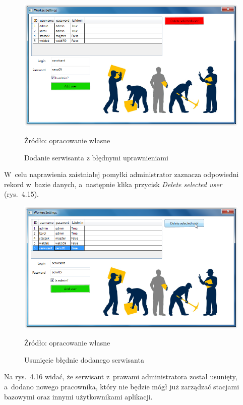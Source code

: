 \documentclass[12pt,a4paper]{report}
\begin{document}
\begin{figure}[!bht]
\centering
\includegraphics[scale=0.5]{Pictures/AddAdmin.png}
\label{fig: AddAdmin}
\caption{Dodanie serwisanta z błędnymi uprawnieniami}{Źródło: opracowanie własne}
\end{figure}

W~celu naprawienia zaistniałej pomyłki administrator zaznacza odpowiedni rekord w~bazie danych, a~następnie klika przycisk \textit{Delete selected user} (rys.~4.15).

\begin{figure}[!bht]
\centering
\includegraphics[scale=0.5]{Pictures/DeletedUser.png}
\label{fig: DeletedUser}
\caption{Usunięcie błędnie dodanego serwisanta}{Źródło: opracowanie własne}
\end{figure}

Na rys.~4.16 widać, że serwisant z~prawami administratora został usunięty, a~dodano nowego pracownika, który nie będzie mógł już zarządzać stacjami bazowymi oraz innymi użytkownikami aplikacji.
\end{document}
